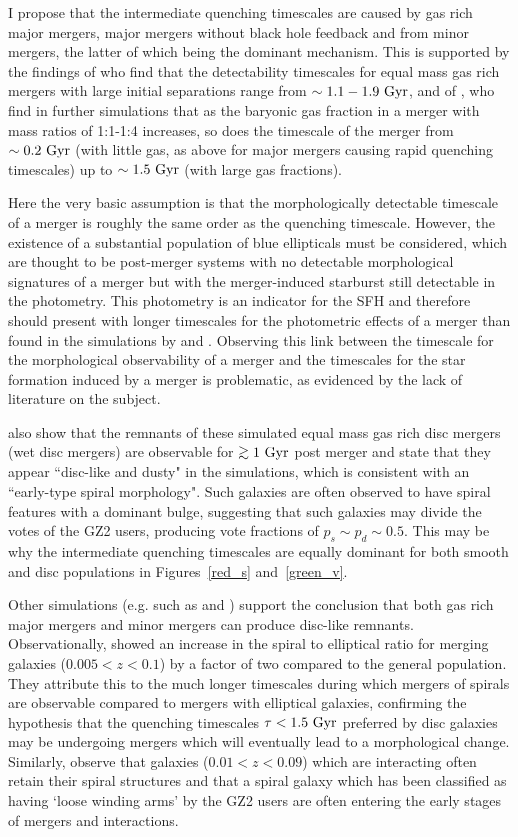 I propose that the intermediate quenching timescales are caused by gas rich major mergers, major mergers without black hole feedback and from minor mergers, the latter of which being the dominant mechanism. This is supported by the findings of \citet{lotz08b} who find that the detectability timescales for equal mass gas rich mergers with large initial separations range from $\sim 1.1-1.9~\rm{Gyr}$, and of \citet{Lotz11}, who find in further simulations that as the baryonic gas fraction in a merger with mass ratios of 1:1-1:4 increases, so does the timescale of the merger from $\sim0.2~\rm{Gyr}$ (with little gas, as above for major mergers causing rapid quenching timescales) up to $\sim1.5~\rm{Gyr}$ (with large gas fractions). 

Here the very basic assumption is that the morphologically detectable timescale of a merger is roughly the same order as the quenching timescale. However, the existence of a substantial population of blue ellipticals \citep{Sch09} must be considered, which are thought to be post-merger systems with no detectable morphological signatures of a merger but with the merger-induced starburst still detectable in the photometry. This photometry is an indicator for the SFH and therefore should present with longer timescales for the photometric effects of a merger than found in the simulations by \citet{lotz08b} and \citet{Lotz11}. Observing this link between the timescale for the morphological observability of a merger and the timescales for the star formation induced by a merger is problematic, as evidenced by the lack of literature on the subject.

\citet{lotz08b} also show that the remnants of these simulated equal mass gas rich disc mergers (wet disc mergers) are observable for $\gtrsim1~\rm{Gyr}$ post merger and state that they appear ``disc-like and dusty" in the simulations, which is consistent with an ``early-type spiral morphology".  Such galaxies are often observed to have spiral features with a dominant bulge, suggesting that such galaxies may divide the votes of the GZ2 users, producing vote fractions of $p_s \sim p_d \sim 0.5$. This may be why the intermediate quenching timescales are equally dominant for both smooth and disc populations in Figures~\ref{red_s} and~\ref{green_v}. 

Other simulations (e.g. such as \citet{robertson06} and \citet{Barnes02}) support the conclusion that both gas rich major mergers and minor mergers can produce disc-like remnants. Observationally, \citet{Darg10a} showed an increase in the spiral to elliptical ratio for merging galaxies ($0.005 < z < 0.1$) by a factor of two compared to the general population. They attribute this to the much longer timescales during which mergers of spirals are observable compared to mergers with elliptical galaxies, confirming the hypothesis that the quenching timescales $\tau < 1.5 ~\rm{Gyr}$ preferred by disc galaxies may be undergoing mergers which will eventually lead to a morphological change. Similarly, \citet{Casteels13} observe that galaxies ($0.01 < z < 0.09$) which are interacting often retain their spiral structures and that a spiral galaxy which has been classified as having `loose winding arms' by the GZ2 users are often entering the early stages of mergers and interactions.

